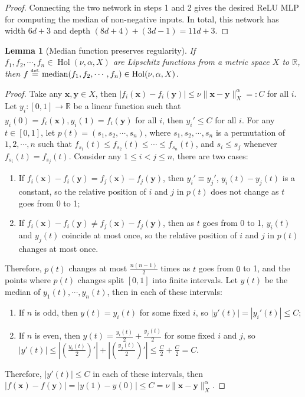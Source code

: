 \documentclass{article}
\numberwithin{equation}{section}
\newtheorem{lemma}{Lemma}[section]
\theoremstyle{definition}
\newcommand{\eqdef}{\ensuremath{\stackrel{\mbox{\upshape\tiny def.}}{=}}}
\begin{document}
\begin{proof}
Connecting the two network in steps 1 and 2 gives the desired ReLU MLP for computing the median of non-negative inputs. In total, this network has width $6d+3$ and depth $(8d+4)+(3d-1)=11d+3$.

\end{proof}


\begin{lemma}[Median function preserves regularity]
\label{lem:median_function_preserves_regularity}
    If $f_1,f_2,\cdots,f_n\in\operatorname{Hol}(\nu,\alpha,X)$ are Lipschitz functions from a metric space $X$ to $\mathbb{R}$, then $f \eqdef \operatorname{median}(f_1,f_2,\cdots,f_n)\in\operatorname{Hol}(\nu,\alpha,X)$.
\end{lemma}

\begin{proof}
Take any $\mathbf{x},\mathbf{y}\in X$, then $|f_i(\mathbf{x})-f_i(\mathbf{y})| \le \nu\|\mathbf{x}-\mathbf{y}\|_X^{\alpha} =:C$ for all $i$. Let $y_i:[0,1]\xrightarrow[]{} \mathbb{R}$ be a linear function such that $y_i(0)=f_i(\mathbf{x}),y_i(1)=f_i(\mathbf{y})$ for all $i$, then $y_i'\le C$ for all $i$. For any $t\in[0,1]$, let $p(t)=(s_1,s_2,\cdots,s_n)$, where $s_1,s_2,\cdots,s_n$ is a permutation of $1,2,\cdots,n$ such that $f_{s_1}(t)\le f_{s_2}(t)\le\cdots\le f_{s_n}(t)$, and $s_i \le s_j$ whenever $f_{s_i}(t)=f_{s_j}(t)$. Consider any $1\le i<j\le n$, there are two cases:
\begin{enumerate}
    \item If $f_i(\mathbf{x})-f_i(\mathbf{y}) = f_j(\mathbf{x})-f_j(\mathbf{y})$, then $y_i' \equiv y_j'$, $y_i(t)-y_j(t)$ is a constant, so the relative position of $i$ and $j$ in $p(t)$ does not change as $t$ goes from $0$ to 1;
    \item If $f_i(\mathbf{x})-f_i(\mathbf{y}) \ne f_j(\mathbf{x})-f_j(\mathbf{y})$, then as $t$ goes from $0$ to 1, $y_i(t)$ and $y_j(t)$ coincide at most once, so the relative position of $i$ and $j$ in $p(t)$ changes at most once.
\end{enumerate}
Therefore, $p(t)$ changes at most $\frac{n(n-1)}{2}$ times as $t$ goes from $0$ to 1, and the points where $p(t)$ changes split $[0,1]$ into finite intervals. Let $y(t)$ be the median of $y_1(t),\cdots,y_n(t)$, then in each of these intervals: 
\begin{enumerate}
    \item If $n$ is odd, then $y(t)=y_i(t)$ for some fixed $i$, so $|y'(t)|=|y_i'(t)| \le C$;
    \item If $n$ is even, then $y(t)=\frac{y_i(t)}{2}+\frac{y_j(t)}{2}$ for some fixed $i$ and $j$, so $|y'(t)| \le \left|\left(\frac{y_i(t)}{2}\right)'\right|+\left|\left(\frac{y_j(t)}{2}\right)'\right| \le \frac{C}{2}+\frac{C}{2} = C$.
\end{enumerate}
Therefore, $|y'(t)| \le C$ in each of these intervals, then $|f(\mathbf{x})-f(\mathbf{y})| = |y(1)-y(0)| \le C = \nu\|\mathbf{x}-\mathbf{y}\|_X^{\alpha}$.
\end{proof}
\end{document}
